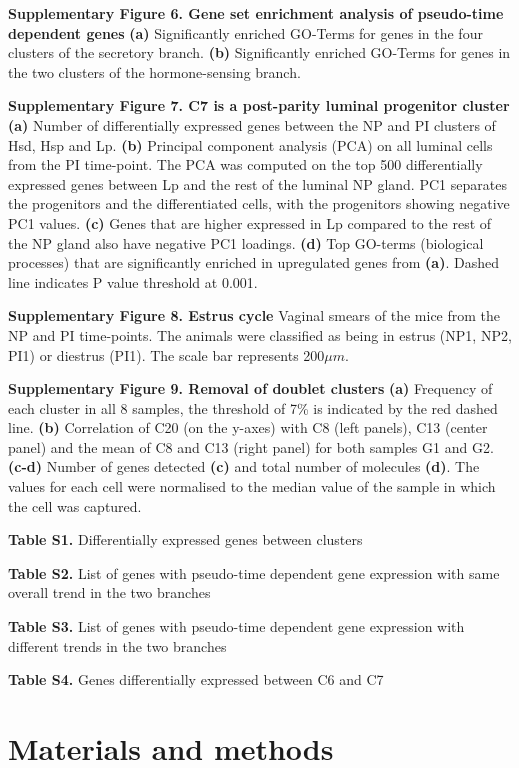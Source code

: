 \documentclass[titlepage, 12pt, oneside]{amsart}
\begin{document}
\textbf{Supplementary Figure 6. Gene set enrichment analysis of pseudo-time dependent genes}
\textbf{(a)} Significantly enriched GO-Terms for genes in the four clusters of the secretory branch.
\textbf{(b)} Significantly enriched GO-Terms for genes in the two clusters of the hormone-sensing branch.

\textbf{Supplementary Figure 7. C7 is a post-parity luminal progenitor cluster}
\textbf{(a)} Number of differentially expressed genes between the NP and PI clusters of Hsd, Hsp and Lp.
\textbf{(b)} Principal component analysis (PCA) on all luminal cells from the PI time-point.
The PCA was computed on the top 500 differentially expressed genes between Lp and the rest of the luminal NP gland.
PC1 separates the progenitors and the differentiated cells, with the progenitors showing negative PC1 values.
\textbf{(c)} Genes that are higher expressed in Lp compared to the rest of the NP gland also have negative PC1 loadings.
\textbf{(d)} Top GO-terms (biological processes) that are significantly enriched in upregulated genes from \textbf{(a)}.
Dashed line indicates P value threshold at 0.001.

\textbf{Supplementary Figure 8. Estrus cycle}
Vaginal smears of the mice from the NP and PI time-points. The animals were classified as being in estrus (NP1, NP2, PI1) or diestrus (PI1). The scale bar represents 200$\mu m$.

\textbf{Supplementary Figure 9. Removal of doublet clusters}
\textbf{(a)} Frequency of each cluster in all 8 samples, the threshold of 7\% is indicated by the red dashed line.
\textbf{(b)} Correlation of C20 (on the y-axes) with C8 (left panels), C13 (center panel) and the mean of C8 and C13 (right panel) for both samples G1 and G2.
\textbf{(c-d)} Number of genes detected \textbf{(c)} and total number of molecules \textbf{(d)}. The values for each cell were normalised to the median value of the sample in which the cell was captured.

\textbf{Table S1.} Differentially expressed genes between clusters

\textbf{Table S2.} List of genes with pseudo-time dependent gene
expression with same overall trend in the two branches

\textbf{Table S3.} List of genes with pseudo-time dependent gene
expression with different trends in the two branches

\textbf{Table S4.} Genes differentially expressed between C6 and C7 

\section{Materials and methods}
\end{document}
